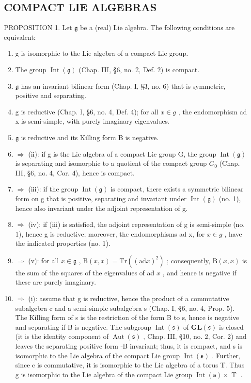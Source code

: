 \subsection{COMPACT LIE ALGEBRAS}

PROPOSITION 1. Let \(\mathfrak{g}\) be a (real) Lie algebra. The following conditions are equivalent:

\begin{enumerate}
\def\labelenumi{(\roman{enumi})}
\item
  g is isomorphic to the Lie algebra of a compact Lie group.
\item
  The group \(\operatorname{Int}(\mathfrak{g})\) (Chap. III, §6, no. 2, Def. 2) is compact.
\item
  \(\mathfrak{g}\) has an invariant bilinear form (Chap. I, §3, no. 6) that is symmetric, positive and separating.
\item
  g is reductive (Chap. I, §6, no. 4, Def. 4); for all \(x \in g\) , the endomorphism ad x is semi-simple, with purely imaginary eigenvalues.
\item
  \(\mathfrak{g}\) is reductive and its Killing form B is negative.
\item
  \(\Longrightarrow\) (ii): if g is the Lie algebra of a compact Lie group G, the group \(\operatorname{Int}(\mathfrak{g})\) is separating and isomorphic to a quotient of the compact group \(G_{0}\) (Chap. III, §6, no. 4, Cor. 4), hence is compact.
\item
  \(\Longrightarrow\) (iii): if the group \(\operatorname{Int}(\mathfrak{g})\) is compact, there exists a symmetric bilinear form on g that is positive, separating and invariant under \(\operatorname{Int}(\mathfrak{g})\) (no. 1), hence also invariant under the adjoint representation of g.
\item
  \(\Longrightarrow\) (iv): if (iii) is satisfied, the adjoint representation of g is semi-simple (no. 1), hence g is reductive; moreover, the endomorphisms ad x, for \(x \in g\) , have the indicated properties (no. 1).
\item
  \(\Longrightarrow\) (v): for all \(x\in \mathfrak{g}\) , \(\mathrm{B}(x,x) = \mathrm{Tr}((\mathrm{ad}x)^2)\) ; consequently, \(\mathrm{B}(x,x)\) is the sum of the squares of the eigenvalues of ad \(x\) , and hence is negative if these are purely imaginary.
\item
  \(\Longrightarrow\) (i): assume that g is reductive, hence the product of a commutative subalgebra c and a semi-simple subalgebra s (Chap. I, §6, no. 4, Prop. 5). The Killing form of s is the restriction of the form B to s, hence is negative and separating if B is negative. The subgroup \(\operatorname{Int}(\mathfrak{s})\) of \(\mathbf{GL}(\mathfrak{s})\) is closed (it is the identity component of \(\operatorname{Aut}(\mathfrak{s})\) , Chap. III, §10, no. 2, Cor. 2) and leaves the separating positive form -B invariant; thus, it is compact, and s is isomorphic to the Lie algebra of the compact Lie group \(\operatorname{Int}(\mathfrak{s})\) . Further, since c is commutative, it is isomorphic to the Lie algebra of a torus T. Thus g is isomorphic to the Lie algebra of the compact Lie group \(\operatorname{Int}(\mathfrak{s}) \times \operatorname{T}\) .
\end{enumerate}

